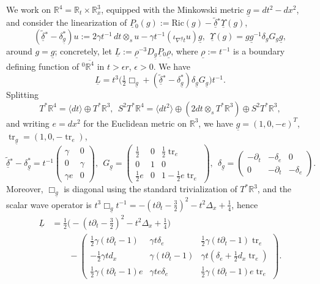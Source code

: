 \documentclass[reqno,11pt,letterpaper]{amsart}
\numberwithin{equation}{section}
\numberwithin{figure}{section}
\theoremstyle{definition}
\theoremstyle{remark}
\newcommand{\R}{\mathbb{R}}
\newcommand{\tr}{\operatorname{tr}}
\newcommand{\Ups}{\Upsilon}
\newcommand{\eps}{\epsilon}
\newcommand{\la}{\langle}
\newcommand{\ol}{\overline}
\newcommand{\pa}{\partial}
\newcommand{\ra}{\rangle}
\newcommand{\ul}[1]{\underline{#1}{}}
\newcommand{\wt}{\widetilde}
\newcommand{\half}{\tfrac{1}{2}}
\newcommand{\tdel}{\wt{\delta}{}}
\newcommand{\Ric}{\mathrm{Ric}}
\begin{document}
We work on $\R^4=\R_t\times\R^3_x$, equipped with the Minkowski metric $\ul g=dt^2-dx^2$, and consider the linearization of $\ul P_0(g):=\Ric(g)-\ul\tdel^*\ul\Ups(g)$,
\[
  (\ul\tdel^*-\delta_{\ul g}^*)u := 2\gamma t^{-1}\,dt\otimes_s u - \gamma t^{-1}(\iota_{\nabla^{\ul g}t}u)\ul g,\ \ 
  \ul\Ups(g) = g \ul g^{-1}\delta_g G_g \ul g,
\]
around $g=\ul g$; concretely, let $\ul L:=\ul\rho^{-3}D_{\ul g}\ul P_0\ul\rho$, where $\ul\rho:=t^{-1}$ is a boundary defining function of ${}^0\ol{\R^4}$ in $t>\eps r$, $\eps>0$. We have
\[
  \ul L = t^3\bigl(\half\Box_{\ul g} + (\ul\tdel^*-\delta_{\ul g}^*)\delta_{\ul g} G_{\ul g}\bigr)t^{-1}.
\]
Splitting
\begin{equation}
\label{EqCoMinkBundle}
  T^*\R^4 = \la dt\ra \oplus T^*\R^3,\ \ 
  S^2 T^*\R^4 = \la dt^2\ra \oplus (2 dt\otimes_s T^*\R^3) \oplus S^2 T^*\R^3,
\end{equation}
and writing $e=dx^2$ for the Euclidean metric on $\R^3$, we have $\ul g=(1,0,-e)^T$, $\tr_{\ul g}=(1,0,-\tr_e)$,
\[
  \ul\tdel^*-\delta_{\ul g}^*=t^{-1}
  \begin{pmatrix}
    \gamma & 0 \\
    0 & \gamma \\
    \gamma e & 0
  \end{pmatrix},\ \ 
  G_{\ul g}=
  \begin{pmatrix}
    \half & 0 & \half\tr_e \\
    0 & 1 & 0 \\
    \half e & 0 & 1-\half e\tr_e
  \end{pmatrix},\ \ 
  \delta_{\ul g}=
  \begin{pmatrix}
    -\pa_t & -\delta_e & 0 \\
    0 & -\pa_t & -\delta_e
  \end{pmatrix}.
\]
Moreover, $\Box_{\ul g}$ is diagonal using the standard trivialization of $T^*\R^3$, and the scalar wave operator is $t^3\Box_{\ul g} t^{-1}=-(t\pa_t-\tfrac32)^2-t^2\Delta_x+\tfrac14$, hence
\begin{align*}
  \ul L &= \half\bigl(-(t\pa_t-\tfrac32)^2-t^2\Delta_x+\tfrac14\bigr) \\
   &\qquad -\begin{pmatrix}
     \half\gamma(t\pa_t-1) & \gamma t\delta_e & \half\gamma(t\pa_t-1)\tr_e \\
     -\half\gamma t d_x & \gamma(t\pa_t-1) & \gamma t(\delta_e+\half d_x\tr_e) \\
     \half\gamma(t\pa_t-1)e & \gamma t e\delta_e & \half\gamma(t\pa_t-1)e\tr_e
   \end{pmatrix}.
\end{align*}
\end{document}
